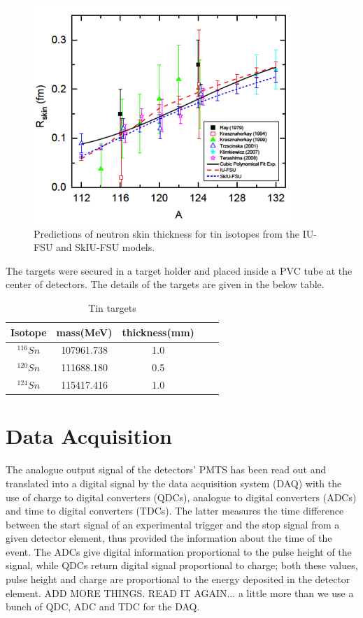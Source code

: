 \begin{figure}[H]
\begin{center}
\includegraphics[scale=0.8]{pictures/png/tiniso.png}
\caption{Predictions of neutron skin thickness for tin isotopes from the IU-FSU and SkIU-FSU models.}
\label{isochain}
\end{center}
\end{figure} 

\indent The targets were secured in a target holder and placed inside a PVC tube at the center of detectors. The details of the targets are given in the below table.

\begin{table}[ht]
\caption{Tin targets}
\centering
\begin{tabular}{c c c c c}
\hline\hline
Isotope & mass(MeV) & thickness(mm)  \\
\hline
$^{116}Sn$ & 107961.738 & 1.0 \\
\hline
$^{120}Sn$ & 111688.180 & 0.5 \\
\hline
$^{124}Sn$ & 115417.416 & 1.0 \\
\hline\hline
\end{tabular}
\label{table_targets}
\end{table} 

\section{Data Acquisition}

\indent The analogue output signal of the detectors' PMTS has been read out and translated into a digital signal by the data acquisition system (DAQ) with the use of charge to digital converters (QDCs), analogue to digital converters (ADCs) and time to digital converters (TDCs). The latter measures the time difference between the start signal of an experimental trigger and the stop signal from a given detector element, thus provided the information about the time of the event. The ADCs give digital information proportional to the pulse height of the signal, while QDCs return digital signal proportional to charge; both these values, pulse height and charge are proportional to the energy deposited in the detector element.
ADD MORE THINGS. READ IT AGAIN... a little more than we use a bunch of QDC, ADC and TDC for the DAQ.

